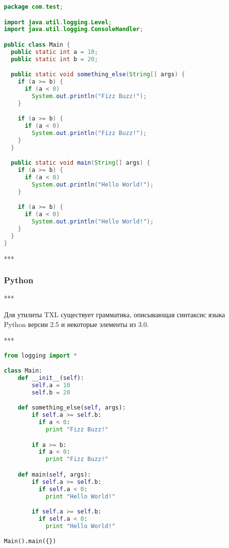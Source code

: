 \begin{lstlisting}[frame=single, language=Java, label={test-java}, caption={Исходный текст тестового приложения.}]
package com.test;

import java.util.logging.Level;
import java.util.logging.ConsoleHandler;

public class Main {
  public static int a = 10;
  public static int b = 20;

  public static void something_else(String[] args) {
    if (a >= b) {
      if (a < 0)
        System.out.println("Fizz Buzz!");
    }

    if (a >= b) {
      if (a < 0)
        System.out.println("Fizz Buzz!");
    }
  }

  public static void main(String[] args) {
    if (a >= b) {
      if (a < 0)
        System.out.println("Hello World!");
    }

    if (a >= b) {
      if (a < 0)
        System.out.println("Hello World!");
    }
  }
}
\end{lstlisting}

***

\subsubsection{Python}

***

Для утилиты TXL существует грамматика, описывающая синтаксис языка Python версии 2.5 и некоторые элементы из 3.0.

***

\begin{lstlisting}[frame=single, language=Python, label={test-python}, caption={Исходный текст тестового приложения.}]
from logging import *

class Main:
    def __init__(self):
        self.a = 10
        self.b = 20

    def something_else(self, args):
        if self.a >= self.b:
          if a < 0:
            print "Fizz Buzz!"

        if a >= b:
          if a < 0:
            print "Fizz Buzz!"

    def main(self, args):
        if self.a >= self.b:
          if self.a < 0:
            print "Hello World!"

        if self.a >= self.b:
          if self.a < 0:
            print "Hello World!"

Main().main({})
\end{lstlisting}

